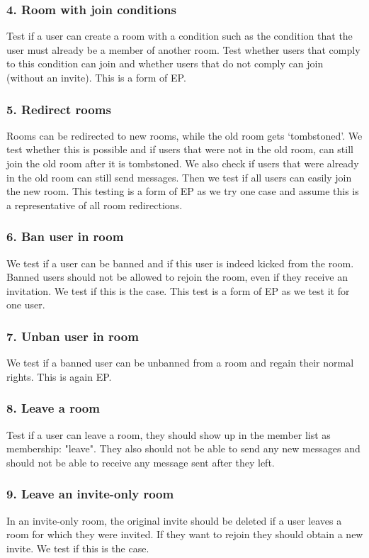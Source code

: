 \documentclass{article}
\begin{document}
\subsubsection*{4. Room with join conditions}
Test if a user can create a room with a condition such as the condition that the user must already be a member of another room. Test whether users that comply to this condition can join and whether users that do not comply can join (without an invite). This is a form of EP.

\subsubsection*{5. Redirect rooms}
Rooms can be redirected to new rooms, while the old room gets `tombstoned'. We test whether this is possible and if users that were not in the old room, can still join the old room after it is tombstoned. We also check if users that were already in the old room can still send messages. Then we test if all users can easily join the new room. This testing is a form of EP as we try one case and assume this is a representative of all room redirections.

\subsubsection*{6. Ban user in room}
We test if a user can be banned and if this user is indeed kicked from the room. Banned users should not be allowed to rejoin the room, even if they receive an invitation. We test if this is the case. This test is a form of EP as we test it for one user.

\subsubsection*{7. Unban user in room}
We test if a banned user can be unbanned from a room and regain their normal rights. This is again EP.

\subsubsection*{8. Leave a room}
Test if a user can leave a room, they should show up in the member list as membership: "leave". They also should not be able to send any new messages and should not be able to receive any message sent after they left.

\subsubsection*{9. Leave an invite-only room}
In an invite-only room, the original invite should be deleted if a user leaves a room for which they were invited. If they want to rejoin they should obtain a new invite. We test if this is the case.
\end{document}
